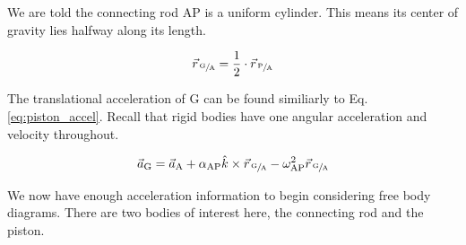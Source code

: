 \documentclass[nofoot,pdf-a,balance,colorlinks,upint,subscriptcorrection,varvw,mathalfa=cal=boondoxo]{asmeconf}
\begin{document}
    We are told the connecting rod AP is a uniform cylinder. This means its center of gravity lies halfway along its length.

    \begin{equation}
        \vec{r}_{\,\sfrac{\textrm{G}}{\textrm{A}}} = \frac{1}{2}\cdot \vec{r}_{\,\sfrac{\textrm{P}}{\textrm{A}}}
    \end{equation}

    The translational acceleration of G can be found similiarly to Eq. \eqref{eq:piston_accel}. Recall that rigid bodies have one angular acceleration and velocity throughout.

    \begin{equation}
        \vec{a}_{\textrm{G}} = \vec{a}_{\textrm{A}} + \alpha_{\textrm{AP}}\hat{k} \times \vec{r}_{\,\sfrac{\textrm{G}}{\textrm{A}}} - \omega_{\textrm{AP}}^2 \vec{r}_{\,\sfrac{\textrm{G}}{\textrm{A}}}
    \end{equation}

    We now have enough acceleration information to begin considering free body diagrams. There are two bodies of interest here, the connecting rod and the piston.



\end{document}
